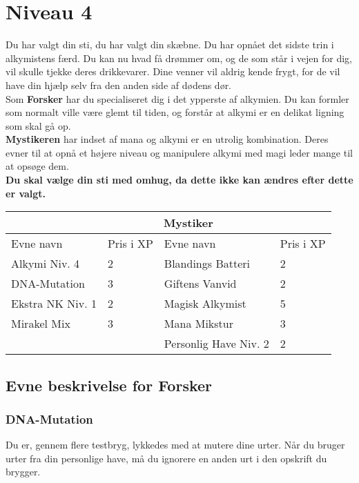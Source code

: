 \chapter{Niveau 4}
Du har valgt din sti, du har valgt din skæbne. Du har opnået det sidste trin i alkymistens færd. Du kan nu hvad få drømmer om, og de som står i vejen for dig, vil skulle tjekke deres drikkevarer. Dine venner vil aldrig kende frygt, for de vil have din hjælp selv fra den anden side af dødens dør.\\
Som \textbf{Forsker} har du specialiseret dig i det ypperste af alkymien. Du kan formler som normalt ville være glemt til tiden, og forstår at alkymi er en delikat ligning som skal gå op.\\
\textbf{Mystikeren} har indset af mana og alkymi er en utrolig kombination. Deres evner til at opnå et højere niveau og manipulere alkymi med magi leder mange til at opsøge dem.\\

\textbf{Du skal vælge din sti med omhug, da dette ikke kan ændres efter dette er valgt.}\\

\begin{tabular}{|p{}|p{}|p{}|p{}|}
\hline
\rowcolor{cerulean!80}
 \multicolumn{2}{|c|}{  Forsker } & \multicolumn{2}{|c|}{ Mystiker }\\
\hline
\rowcolor{cerulean!40}
    Evne navn & Pris i XP & Evne navn & Pris i XP\\ \hline
    Alkymi Niv. 4 & 2 & Blandings Batteri & 2 \\ \hline
    DNA-Mutation & 3 & Giftens Vanvid & 2\\\hline
    Ekstra NK Niv. 1 & 2 & Magisk Alkymist  & 5\\\hline
    Mirakel Mix & 3 & Mana Mikstur & 3\\\hline
     &  & Personlig Have Niv. 2 & 2\\
\hline
\end{tabular}

\section{Evne beskrivelse for Forsker}



\subsection{DNA-Mutation}
Du er, gennem flere testbryg, lykkedes med at mutere dine urter. Når du bruger urter fra din personlige have, må du ignorere en anden urt i den opskrift du brygger.\\

